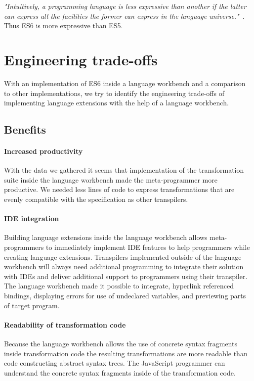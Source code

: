 \textit{"Intuitively, a programming language is less expressive than another if the latter can express all the facilities the former can express in the language universe."}~\cite{Felleisen1990}. Thus ES6 is more expressive than ES5.

\section{Engineering trade-offs}

With an implementation of ES6 inside a language workbench and a comparison to other implementations, we try to identify the engineering trade-offs of implementing language extensions with the help of a language workbench.

\subsection{Benefits}

\paragraph{Increased productivity}
With the data we gathered it seems that implementation of the transformation suite inside the language workbench made the meta-programmer more productive. We needed less lines of code to express transformations that are evenly compatible with the specification as other transpilers. 

\paragraph{IDE integration}
Building language extensions inside the language workbench allows meta-programmers to immediately implement IDE features to help programmers while creating language extensions. Transpilers implemented outside of the language workbench will always need additional programming to integrate their solution with IDEs and deliver additional support to programmers using their transpiler. The language workbench made it possible to integrate, hyperlink referenced bindings, displaying errors for use of undeclared variables, and previewing parts of target program. 

\paragraph{Readability of transformation code}
Because the language workbench allows the use of concrete syntax fragments inside transformation code the resulting transformations are more readable than code constructing abstract syntax trees. The JavaScript programmer can understand the concrete syntax fragments inside of the transformation code.

